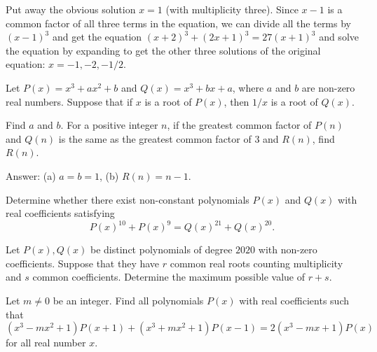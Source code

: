 \begin{solution}[name=Solution by CRMO 2002]
Put away the obvious solution $x=1$ (with multiplicity three). Since $x-1$ is a common factor of all three terms in the equation, we can divide all the terms by $(x-1)^3$ and get the equation $(x+2)^3 + (2x+1)^3 = 27(x+1)^3$ and solve the equation by expanding to get the other three solutions of the original equation: $x=-1, -2, -1/2$.
\end{solution}



\begin{question}
Let $P(x)=x^3+ax^2+b$ and $Q(x)=x^3+bx+a$, where $a$ and $b$ are non-zero real numbers. Suppose that if $x$ is a root of $P(x)$, then $1/x$ is a root of $Q(x)$.
\begin{tasks}
    \task Find $a$ and $b$.
    \task For a positive integer $n$, if the greatest common factor of $P(n)$ and $Q(n)$ is the same as the greatest common factor of $3$ and $R(n)$, find $R(n)$. 
\end{tasks}
\end{question}


\begin{solution}[name=Solution Inspired by RMO 2013]
Answer: (a) $a=b=1$, (b) $R(n)=n-1$.
\end{solution}

\begin{question}[name={2018 Romanian Masters in Mathematics}]
    Determine whether there exist non-constant polynomials $P(x)$ and $Q(x)$ with real coefficients satisfying $$P(x)^{10}+P(x)^9 = Q(x)^{21}+Q(x)^{20}.$$
\end{question}


\begin{question}[name={2020 Balkan TST}]
    Let $P(x), Q(x)$ be distinct polynomials of degree $2020$ with non-zero coefficients. Suppose that they have $r$ common real roots counting multiplicity and $s$ common coefficients. Determine the maximum possible value of $r + s$.
\end{question}


\begin{question}[name={2013 IMO Shortlist}]
    Let $m \neq 0 $ be an integer. Find all polynomials $P(x) $ with real coefficients such that
    \[ (x^3 - mx^2 +1 ) P(x+1)  + (x^3+mx^2+1) P(x-1) =2(x^3 - mx +1 ) P(x) \]
    for all real number $x$.
\end{question}

